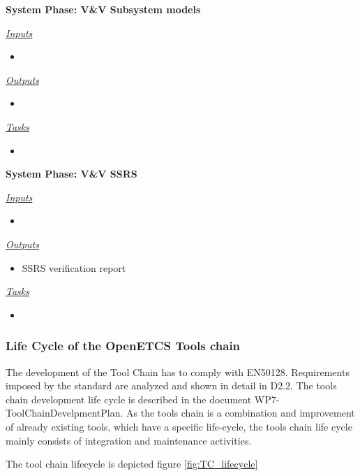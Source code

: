 \documentclass{template/openetcs_article}
\begin{document}
\begin{description}
\item \textbf{System Phase: V\&V Subsystem models}

\underline{\textit{Inputs}}
\begin{itemize}
\item 
\end{itemize}

\underline{\textit{Outputs}}
\begin{itemize}
\item 
\end{itemize}

\underline{\textit{Tasks}}
\begin{itemize}
\item 
\end{itemize}
\end{description}

\begin{description}
\item \textbf{System Phase: V\&V SSRS}

\underline{\textit{Inputs}}
\begin{itemize}
\item 
\end{itemize}

\underline{\textit{Outputs}}
\begin{itemize}
\item SSRS verification report
\end{itemize}

\underline{\textit{Tasks}}
\begin{itemize}
\item 
\end{itemize}
\end{description}

\subsubsection{Life Cycle of the OpenETCS Tools chain}
The development of the Tool Chain has to comply with EN50128. Requirements imposed by the standard are analyzed and shown in detail in D2.2. The tools chain development life cycle is described in the document WP7-ToolChainDevelpmentPlan. As the tools chain is a combination and improvement of already existing tools, which have a specific life-cycle, the tools chain life cycle mainly consists of integration and maintenance activities. 

The tool chain lifecycle is depicted figure  \ref{fig:TC_lifecycle}
\end{document}
